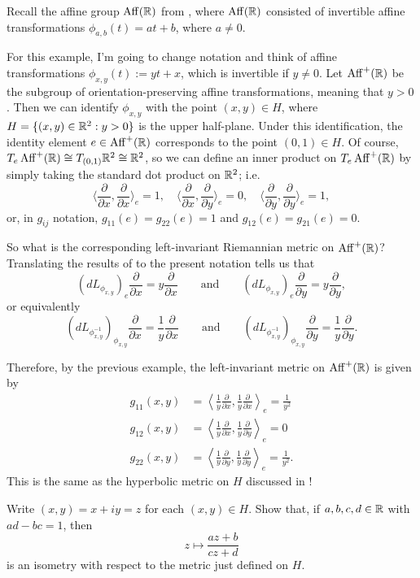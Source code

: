 \begin{example}\label{ex:affine hyperbolic metric}
	Recall the affine group $\operatorname{Aff}(\mathbb{R})$ from , where $\operatorname{Aff}(\mathbb{R})$ consisted of invertible affine transformations $\phi_{a,b}(t) = at + b$, where $a \neq 0$. 
	
	For this example, I'm going to change notation and think of affine transformations $\phi_{x,y}(t) := yt + x$, which is invertible if $y \neq 0$. Let $\operatorname{Aff}^+(\mathbb{R})$ be the subgroup of orientation-preserving affine transformations, meaning that $y > 0$. Then we can identify $\phi_{x,y}$ with the point $(x,y) \in H$, where $H = \{(x,y) \in \mathbb{R}^2 : y > 0\}$ is the upper half-plane. Under this identification, the identity element $e \in \operatorname{Aff}^+(\mathbb{R})$ corresponds to the point $(0,1) \in H$. Of course, $T_e \operatorname{Aff}^+(\mathbb{R}) \cong T_{(0,1)} \mathbb{R}^2 \cong \mathbb{R}^2$, so we can define an inner product on $T_e \operatorname{Aff}^+(\mathbb{R})$ by simply taking the standard dot product on $\mathbb{R}^2$; i.e.
	\[
		\langle \frac{\partial}{\partial x}, \frac{\partial}{\partial x} \rangle_e = 1, \quad \langle \frac{\partial}{\partial x}, \frac{\partial}{\partial y} \rangle_e = 0, \quad \langle \frac{\partial}{\partial y}, \frac{\partial}{\partial y} \rangle_e = 1,
	\]
	or, in $g_{ij}$ notation, $g_{11}(e) = g_{22}(e) = 1$ and $g_{12}(e) = g_{21}(e) = 0$.
	
	So what is the corresponding left-invariant Riemannian metric on $\operatorname{Aff}^+(\mathbb{R})$? Translating the results of  to the present notation tells us that
	\[
		(dL_{\phi_{x,y}})_e \frac{\partial}{\partial x} = y \frac{\partial}{\partial x} \qquad \text{and} \qquad (dL_{\phi_{x,y}})_e \frac{\partial}{\partial y} = y \frac{\partial}{\partial y},
	\]
	or equivalently
	\[
		(dL_{\phi_{x,y}^{-1}})_{\phi_{x,y}} \frac{\partial}{\partial x} = \frac{1}{y} \frac{\partial}{\partial x} \qquad \text{and} \qquad (dL_{\phi_{x,y}^{-1}})_{\phi_{x,y}} \frac{\partial}{\partial y} = \frac{1}{y} \frac{\partial}{\partial y}.
	\]
	
	Therefore, by the previous example, the left-invariant metric on $\operatorname{Aff}^+(\mathbb{R})$ is given by
	\begin{align*}
		g_{11}(x,y) & = \left\langle \frac{1}{y} \frac{\partial}{\partial x}, \frac{1}{y} \frac{\partial}{\partial x} \right\rangle_e = \frac{1}{y^2} \\
		g_{12}(x,y) & = \left\langle \frac{1}{y} \frac{\partial}{\partial x}, \frac{1}{y} \frac{\partial}{\partial y} \right\rangle_e = 0 \\
		g_{22}(x,y) & = \left\langle \frac{1}{y} \frac{\partial}{\partial y}, \frac{1}{y} \frac{\partial}{\partial y} \right\rangle_e = \frac{1}{y^2}.
	\end{align*}
	This is the same as the hyperbolic metric on $H$ discussed in !
	
	\begin{exercise}
		Write $(x,y) = x+iy = z$ for each $(x,y) \in H$. Show that, if $a,b,c,d \in \mathbb{R}$ with $ad-bc = 1$, then
		\[
			z \mapsto \frac{az+b}{cz+d}
		\]
		is an isometry with respect to the metric just defined on $H$.
	\end{exercise}
\end{example}

